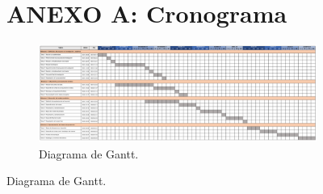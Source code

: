 \begin{figure}

\renewcommand\thefigure{A.\arabic{figure}}  
\setcounter{figure}{0} 

\section*{ANEXO A: Cronograma}
{}

\begin{figure}[H]
  \centering
  \includegraphics[width = 22cm]{E_IMAGENES/Anexos/gantt}
  \caption{Diagrama de Gantt.}
  \label{fig:cronograma}
\end{figure}

\end{figure}
